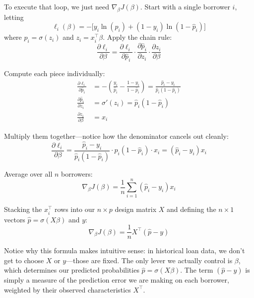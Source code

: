 \documentclass[12pt]{article}
\begin{document}
To execute that loop, we just need $\nabla_\beta J(\beta)$. Start with a single
borrower $i$, letting
\begin{equation}
    \ell_i(\beta) = -\Big[ y_i \ln(\hat{p}_i) + (1 - y_i) \ln(1 - \hat{p}_i) \Big]
\end{equation}
where $\hat{p}_i = \sigma(z_i)$ and $z_i = x_i^\top \beta$. Apply the chain rule:
\begin{equation}
    \frac{\partial \ell_i}{\partial \beta}
    = \frac{\partial \ell_i}{\partial \hat{p}_i}
      \cdot \frac{\partial \hat{p}_i}{\partial z_i}
      \cdot \frac{\partial z_i}{\partial \beta}
\end{equation}

Compute each piece individually:
\begin{align}
    \frac{\partial \ell_i}{\partial \hat{p}_i}
        &= -\left( \frac{y_i}{\hat{p}_i} - \frac{1 - y_i}{1 - \hat{p}_i} \right)
         = \frac{\hat{p}_i - y_i}{\hat{p}_i(1 - \hat{p}_i)} \\
    \frac{\partial \hat{p}_i}{\partial z_i}
        &= \sigma'(z_i) = \hat{p}_i(1 - \hat{p}_i) \\
    \frac{\partial z_i}{\partial \beta}
        &= x_i
\end{align}

Multiply them together---notice how the denominator cancels out cleanly:
\begin{equation}
    \frac{\partial \ell_i}{\partial \beta}
    = \frac{\hat{p}_i - y_i}{\hat{p}_i(1 - \hat{p}_i)}
      \cdot \hat{p}_i(1 - \hat{p}_i)
      \cdot x_i
    = (\hat{p}_i - y_i) x_i
\end{equation}

Average over all $n$ borrowers:
\begin{equation}
    \nabla_\beta J(\beta) = \frac{1}{n} \sum_{i=1}^n (\hat{p}_i - y_i) x_i
\end{equation}

Stacking the $x_i^\top$ rows into our $n \times p$ design matrix $X$ and
defining the $n \times 1$ vectors $\hat{p} = \sigma(X\beta)$ and $y$:
\begin{equation}
    \nabla_\beta J(\beta) = \frac{1}{n} X^\top (\hat{p} - y)
\end{equation}

Notice why this formula makes intuitive sense: in historical loan data, we
don't get to choose $X$ or $y$---those are fixed. The only lever we actually
control is $\beta$, which determines our predicted probabilities
$\hat{p} = \sigma(X\beta)$. The term $(\hat{p} - y)$ is simply a measure of the
prediction error we are making on each borrower, weighted by their observed
characteristics $X^\top$.
\end{document}
